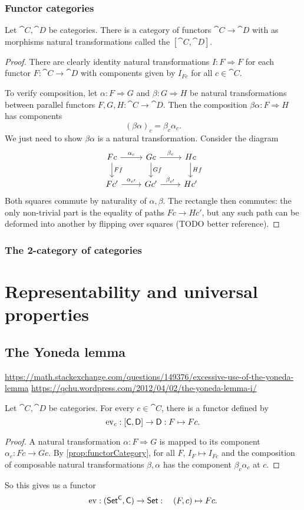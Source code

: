 \subsection{Functor categories}
\begin{proposition} \label{prop:functorCategory}
Let $\cat{C}, \cat{D}$ be categories. There is a category of functors $\cat{C}\to \cat{D}$ with as morphisms natural transformations called the  $[\cat{C},\cat{D}]$.
\end{proposition}
\begin{proof}
There are clearly identity natural transformations $I:F\Rightarrow F$ for each functor $F: \cat{C}\to \cat{D}$ with components given by $I_{Fc}$ for all $c\in\cat{C}$.

To verify composition, let $\alpha: F \Rightarrow G$ and $\beta: G\Rightarrow H$ be natural transformations between parallel functors $F,G,H: \cat{C}\to \cat{D}$. Then the composition	$\beta\alpha: F\Rightarrow H$ has components
\[ (\beta\alpha)_c = \beta_c\alpha_c. \]
We just need to show $\beta\alpha$ is a natural transformation. Consider the diagram
\[ \begin{tikzcd}
Fc \ar[r, "\alpha_c"] \ar[d, "Ff"] & Gc \ar[d, "Gf"] \ar[r, "\beta_c"] & Hc \ar[d,"Hf"] \\
Fc' \ar[r, "{\alpha_{c'}}"] & Gc' \ar[r, "{\beta_{c'}}"] & Hc'
\end{tikzcd} \]
Both squares commute by naturality of $\alpha,\beta$. The rectangle then commutes: the only non-trivial part is the equality of paths $Fc\to Hc'$, but any such path can be deformed into another by flipping over squares (TODO better reference).
\end{proof}

\subsection{The 2-category of categories}


\chapter{Representability and universal properties}
\section{The Yoneda lemma}
\url{https://math.stackexchange.com/questions/149376/excessive-use-of-the-yoneda-lemma}
\url{https://qchu.wordpress.com/2012/04/02/the-yoneda-lemma-i/}
\begin{lemma}
Let $\cat{C},\cat{D}$ be categories. For every $c\in\cat{C}$, there is a functor defined by
\[ \operatorname{ev}_c: [\mathsf{C},\mathsf{D}] \to \mathsf{D}: F\mapsto Fc. \]
\end{lemma}
\begin{proof}
A natural transformation $\alpha: F \Rightarrow G$ is mapped to its component $\alpha_c: Fc \to Gc$. By \ref{prop:functorCategory}, for all $F$, $I_F\mapsto I_{Fc}$ and the composition of composable natural transformations $\beta,\alpha$ has the component $\beta_c\alpha_c$ at $c$.
\end{proof}
So this gives us a functor
\[ \operatorname{ev}: (\mathsf{Set^C}, \mathsf{C}) \to \mathsf{Set}: \quad (F,c)\mapsto Fc.\]

